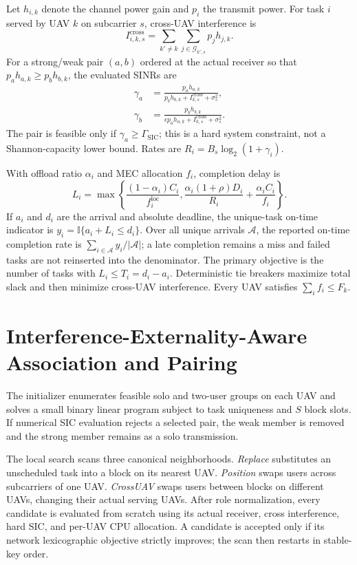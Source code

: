 \documentclass[journal]{IEEEtran}
\begin{document}
Let $h_{i,k}$ denote the channel power gain and $p_i$ the transmit power. For task $i$ served by
UAV $k$ on subcarrier $s$, cross-UAV interference is
\begin{equation}
 I_{i,k,s}^{\mathrm{cross}}=\sum_{k'\ne k}\sum_{j\in\mathcal G_{k',s}}p_jh_{j,k}.
\end{equation}
For a strong/weak pair $(a,b)$ ordered at the actual receiver so that
$p_ah_{a,k}\ge p_bh_{b,k}$, the evaluated SINRs are
\begin{align}
 \gamma_a&=\frac{p_ah_{a,k}}{p_bh_{b,k}+I_{k,s}^{\mathrm{cross}}+\sigma_s^2},\\
 \gamma_b&=\frac{p_bh_{b,k}}{\epsilon p_ah_{a,k}+I_{k,s}^{\mathrm{cross}}+\sigma_s^2}.
\end{align}
The pair is feasible only if $\gamma_a\ge\Gamma_{\mathrm{SIC}}$; this is a hard system
constraint, not a Shannon-capacity lower bound. Rates are $R_i=B_s\log_2(1+\gamma_i)$.

With offload ratio $\alpha_i$ and MEC allocation $f_i$, completion delay is
\begin{equation}
 L_i=\max\left\{\frac{(1-\alpha_i)C_i}{f_i^{\mathrm{loc}}},
 \frac{\alpha_i(1+\rho)D_i}{R_i}+\frac{\alpha_iC_i}{f_i}\right\}.
\end{equation}
If $a_i$ and $d_i$ are the arrival and absolute deadline, the unique-task on-time indicator is
$y_i=\mathbb I\{a_i+L_i\le d_i\}$. Over all unique arrivals $\mathcal A$, the reported on-time
completion rate is $\sum_{i\in\mathcal A}y_i/|\mathcal A|$; a late completion remains a miss and
failed tasks are not reinserted into the denominator. The primary objective is the number of tasks
with $L_i\le T_i=d_i-a_i$. Deterministic tie breakers maximize
total slack and then minimize cross-UAV interference. Every UAV satisfies
$\sum_i f_i\le F_k$.

\section{Interference-Externality-Aware Association and Pairing}
The initializer enumerates feasible solo and two-user groups on each UAV and solves a small binary
linear program subject to task uniqueness and $S$ block slots. If numerical SIC evaluation rejects
a selected pair, the weak member is removed and the strong member remains as a solo transmission.

The local search scans three canonical neighborhoods. \emph{Replace} substitutes an unscheduled
task into a block on its nearest UAV. \emph{Position} swaps users across subcarriers of one UAV.
\emph{CrossUAV} swaps users between blocks on different UAVs, changing their actual serving UAVs.
After role normalization, every candidate is evaluated from scratch using its actual receiver,
cross interference, hard SIC, and per-UAV CPU allocation. A candidate is accepted only if its
network lexicographic objective strictly improves; the scan then restarts in stable-key order.
\end{document}
